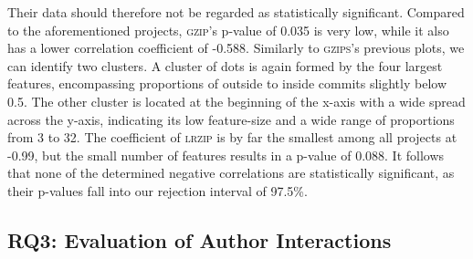 Their data should therefore not be regarded as statistically significant.
Compared to the aforementioned projects, \textsc{gzip}'s p-value of 0.035 is very low, while it also has a lower correlation coefficient of -0.588.
Similarly to \textsc{gzips}'s previous plots, we can identify two clusters.
A cluster of dots is again formed by the four largest features, encompassing proportions of outside to inside commits slightly below 0.5.
The other cluster is located at the beginning of the x-axis with a wide spread across the y-axis, indicating its low feature-size and a wide range of proportions from 3 to 32.
The coefficient of \textsc{lrzip} is by far the smallest among all projects at -0.99, but the small number of features results in a p-value of 0.088.
It follows that none of the determined negative correlations are statistically significant, as their p-values fall into our rejection interval of 97.5\%.

\subsection*{\textbf{RQ3: Evaluation of Author Interactions}}\label{sec:eval_author_interactions}

